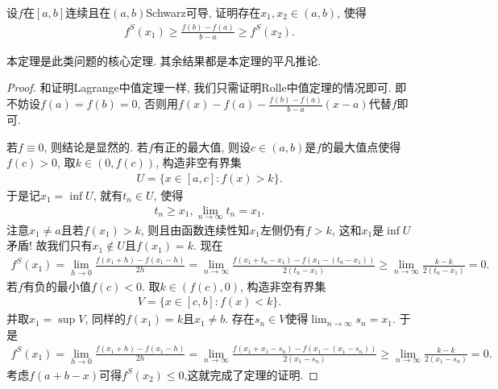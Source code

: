 \documentclass[../../main.tex]{subfiles}
\begin{document}
\begin{theorem}[Schwarz导数的Lagrange中值定理]\label{theorem:Schwarz导数的Lagrange中值定理}
设$f$在$[a,b]$连续且在$(a,b)$Schwarz可导, 证明存在$x_1,x_2 \in (a,b)$, 使得
\begin{align}
f^S(x_1) \geqslant \frac{f(b) - f(a)}{b - a} \geqslant f^S(x_2). \label{eq:13.2348982334242te3fd938523i23903t3ger34t4234898938523i23903t3ger34t4107}
\end{align}
\end{theorem}
\begin{note}
本定理是此类问题的核心定理. 其余结果都是本定理的平凡推论.
\end{note}
\begin{proof}
和证明Lagrange中值定理一样, 我们只需证明Rolle中值定理的情况即可. 即不妨设$f(a) = f(b) = 0$, 否则用$f(x) - f(a) - \frac{f(b)-f(a)}{b - a}(x - a)$代替$f$即可.

若$f \equiv 0$, 则结论是显然的. 若$f$有正的最大值, 则设$c \in (a,b)$是$f$的最大值点使得$f(c) > 0$, 取$k \in (0,f(c))$, 构造非空有界集
\begin{align*}
U = \{x \in [a,c] : f(x) > k\}.
\end{align*}
于是记$x_1 = \inf U$, 就有$t_n \in U$, 使得
\begin{align*}
t_n \geqslant x_1, \lim_{n \to \infty} t_n = x_1.
\end{align*}
注意$x_1 \neq a$且若$f(x_1) > k$, 则且由函数连续性知$x_1$左侧仍有$f > k$, 这和$x_1$是$\inf U$矛盾! 故我们只有$x_1 \notin U$且$f(x_1) = k$.
现在
\begin{align*}
f^S(x_1) = \lim_{h \to 0} \frac{f(x_1 + h) - f(x_1 - h)}{2h} = \lim_{n \to \infty} \frac{f(x_1 + t_n - x_1) - f(x_1 - (t_n - x_1))}{2(t_n - x_1)} \geqslant \lim_{n \to \infty} \frac{k - k}{2(t_n - x_1)} = 0.
\end{align*}
若$f$有负的最小值$f(c) < 0$. 取$k \in (f(c),0)$, 构造非空有界集
\begin{align*}
V = \{x \in [c,b] : f(x) < k\}.
\end{align*}
并取$x_1 = \sup V$, 同样的$f(x_1) = k$且$x_1 \neq b$. 存在$s_n \in V$使得$\lim_{n \to \infty} s_n = x_1$. 于是
\begin{align*}
f^S(x_1) = \lim_{h \to 0} \frac{f(x_1 + h) - f(x_1 - h)}{2h} = \lim_{n \to \infty} \frac{f(x_1 + x_1 - s_n) - f(x_1 - (x_1 - s_n))}{2(x_1 - s_n)} \geqslant \lim_{n \to \infty} \frac{k - k}{2(x_1 - s_n)} = 0.
\end{align*}
考虑$f(a + b - x)$可得$f^S(x_2)\leqslant 0$,这就完成了定理的证明.
\end{proof}
\end{document}
